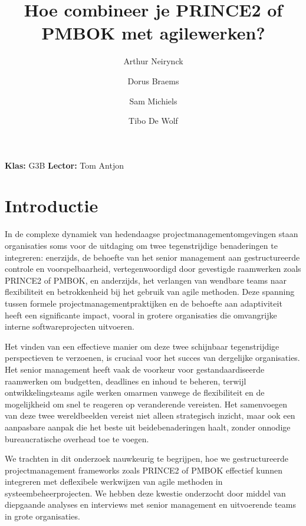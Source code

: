 \documentclass[dutch]{hogent-article}
\title{Hoe combineer je PRINCE2 of PMBOK met agile\linebreak werken?}
\author{Arthur Neirynck}
\author{Dorus Braems}
\author{Sam Michiels}
\author{Tibo De Wolf}
\begin{document}
\begin{abstract}

\end{abstract}
\bigskip
\textbf{Klas:} G3B
\newline
\textbf{Lector:} Tom Antjon

\newpage

\tableofcontents
\pagebreak

\section{Introductie}%
\label{sec:introductie}

In de complexe dynamiek van hedendaagse projectmanagementomgevingen staan organisaties soms voor de uitdaging om twee tegenstrijdige benaderingen te integreren: enerzijds, de behoefte van het senior management aan gestructureerde controle en voorspelbaarheid, vertegenwoordigd door gevestigde raamwerken zoals PRINCE2 of PMBOK, en anderzijds, het verlangen van wendbare teams naar flexibiliteit en betrokkenheid bij het gebruik van agile methoden. Deze spanning tussen formele projectmanagementpraktijken en de behoefte aan adaptiviteit heeft een significante impact, vooral in grotere organisaties die omvangrijke interne softwareprojecten uitvoeren.
\newline

Het vinden van een effectieve manier om deze twee schijnbaar tegenstrijdige perspectieven te verzoenen, is cruciaal voor het succes van dergelijke organisaties. Het senior management heeft vaak de voorkeur voor gestandaardiseerde raamwerken om budgetten, deadlines en inhoud te beheren, terwijl ontwikkelingsteams agile werken omarmen vanwege de flexibiliteit en de mogelijkheid om snel te reageren op veranderende vereisten. Het samenvoegen van deze twee wereldbeelden vereist niet alleen strategisch inzicht, maar ook een aanpasbare aanpak die het beste uit beide\linebreak benaderingen haalt, zonder onnodige bureaucratische overhead toe te voegen.
\newline

We trachten in dit onderzoek nauwkeurig te begrijpen, hoe we gestructureerde \linebreak projectmanagement frameworks zoals PRINCE2 of PMBOK effectief kunnen integreren met de\linebreak flexibele werkwijzen van agile methoden in systeembeheerprojecten. We hebben deze kwestie onderzocht door middel van diepgaande analyses en interviews met senior management en \linebreak uitvoerende teams in grote organisaties.
\newline
\end{document}
